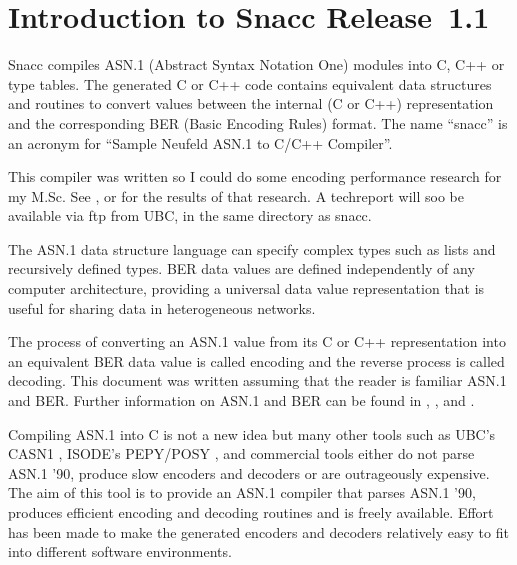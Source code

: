 
%
%
%

\chapter{\label{intro-1.1}Introduction to Snacc Release~1.1}

Snacc compiles ASN.1 \cite{X.208} (Abstract Syntax Notation One)
modules into C, C++ or type tables.  The generated C or C++ code
contains equivalent data structures and routines to convert values
between the internal (C or C++) representation and the corresponding
BER \cite{X.209} (Basic Encoding Rules) format.  The name ``snacc'' is
an acronym for ``Sample Neufeld ASN.1 to C/C++ Compiler''.

This compiler was written so I could do some encoding performance
research for my M.Sc.  See \cite{Sample93-1}, or \cite{Sample93-2} for
the results of that research.  A techreport will soo be available
via ftp from UBC, in the same directory as snacc.

The ASN.1 data structure language can specify complex types such as
lists and recursively defined types. BER data values are defined
independently of any computer architecture, providing a universal data
value representation that is useful for sharing data in heterogeneous
networks.

The process of converting an ASN.1 value from its C or C++
representation into an equivalent BER data value is called encoding
and the reverse process is called decoding.  This document was written
assuming that the reader is familiar ASN.1 and BER.  Further
information on ASN.1 and BER can be found in \cite{ASN.1Book},
\cite{ASN.1Overview}, \cite{X.208} and \cite{X.209}.

Compiling ASN.1 into C is not a new idea but many other tools such as
UBC's CASN1 \cite{CASN1}, ISODE's PEPY/POSY \cite{ISODE}, and
commercial tools either do not parse ASN.1 '90, produce slow encoders
and decoders or are outrageously expensive. The aim of this tool is to
provide an ASN.1 compiler that parses ASN.1 '90, produces efficient
encoding and decoding routines and is freely available.  Effort has
been made to make the generated encoders and decoders relatively easy
to fit into different software environments.

